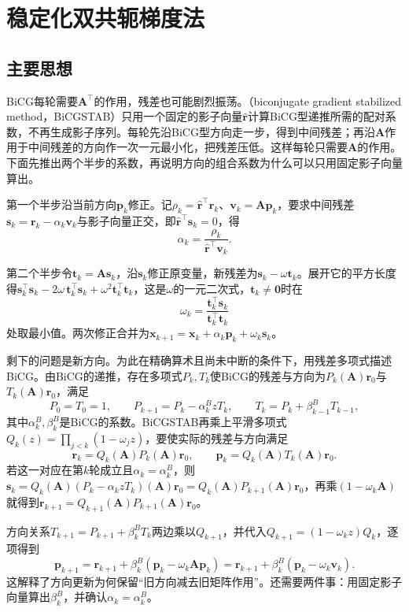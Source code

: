 \section{稳定化双共轭梯度法}
\label{sec:ls-bicgstab}

\subsection{主要思想}

BiCG每轮需要$\bm A^\top$的作用，残差也可能剧烈振荡。（biconjugate gradient stabilized method，BiCGSTAB）只用一个固定的影子向量$\widehat{\bm r}$计算BiCG型递推所需的配对系数，不再生成影子序列。每轮先沿BiCG型方向走一步，得到中间残差；再沿$\bm A$作用于中间残差的方向作一次一元最小化，把残差压低。这样每轮只需要$\bm A$的作用。下面先推出两个半步的系数，再说明方向的组合系数为什么可以只用固定影子向量算出。

第一个半步沿当前方向$\bm p_k$修正。记$\rho_k=\widehat{\bm r}^\top\bm r_k$、$\bm v_k=\bm A\bm p_k$，要求中间残差$\bm s_k=\bm r_k-\alpha_k\bm v_k$与影子向量正交，即$\widehat{\bm r}^\top\bm s_k=0$，得
\[
 \alpha_k=\frac{\rho_k}{\widehat{\bm r}^\top\bm v_k}.
\]

第二个半步令$\bm t_k=\bm A\bm s_k$，沿$\bm s_k$修正原变量，新残差为$\bm s_k-\omega\bm t_k$。展开它的平方长度得$\bm s_k^\top\bm s_k-2\omega\,\bm t_k^\top\bm s_k+\omega^2\bm t_k^\top\bm t_k$，这是$\omega$的一元二次式，$\bm t_k\ne\bm0$时在
\[
 \omega_k=\frac{\bm t_k^\top\bm s_k}{\bm t_k^\top\bm t_k}
\]
处取最小值。两次修正合并为$\bm x_{k+1}=\bm x_k+\alpha_k\bm p_k+\omega_k\bm s_k$。

剩下的问题是新方向。为此在精确算术且尚未中断的条件下，用残差多项式描述BiCG。由BiCG的递推，存在多项式$P_k,T_k$使BiCG的残差与方向为$P_k(\bm A)\bm r_0$与$T_k(\bm A)\bm r_0$，满足
\[
 P_0=T_0=1,\qquad P_{k+1}=P_k-\alpha_k^{B}zT_k,\qquad T_k=P_k+\beta_{k-1}^{B}T_{k-1},
\]
其中$\alpha_k^{B},\beta_k^{B}$是BiCG的系数。BiCGSTAB再乘上平滑多项式$Q_k(z)=\prod_{j<k}(1-\omega_jz)$，要使实际的残差与方向满足
\[
 \bm r_k=Q_k(\bm A)P_k(\bm A)\bm r_0,\qquad \bm p_k=Q_k(\bm A)T_k(\bm A)\bm r_0 .
\]
若这一对应在第$k$轮成立且$\alpha_k=\alpha_k^{B}$，则$\bm s_k=Q_k(\bm A)(P_k-\alpha_kzT_k)(\bm A)\bm r_0=Q_k(\bm A)P_{k+1}(\bm A)\bm r_0$，再乘$(1-\omega_k\bm A)$就得到$\bm r_{k+1}=Q_{k+1}(\bm A)P_{k+1}(\bm A)\bm r_0$。

方向关系$T_{k+1}=P_{k+1}+\beta_k^{B}T_k$两边乘以$Q_{k+1}$，并代入$Q_{k+1}=(1-\omega_kz)Q_k$，逐项得到
\[
 \bm p_{k+1}=\bm r_{k+1}+\beta_k^{B}(\bm p_k-\omega_k\bm A\bm p_k)=\bm r_{k+1}+\beta_k^{B}(\bm p_k-\omega_k\bm v_k).
\]
这解释了方向更新为何保留“旧方向减去旧矩阵作用”。还需要两件事：用固定影子向量算出$\beta_k^{B}$，并确认$\alpha_k=\alpha_k^{B}$。

